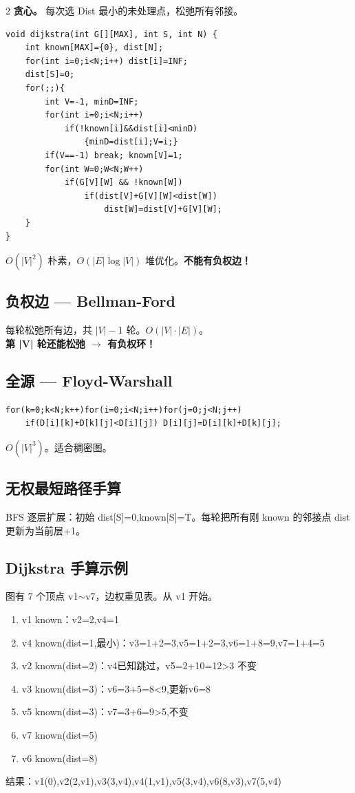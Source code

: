 \documentclass[10pt,a4paper]{article}
\begin{document}
\begin{multicols}{2}
\textbf{贪心。} 每次选 Dist 最小的未处理点，松弛所有邻接。

\begin{lstlisting}
void dijkstra(int G[][MAX], int S, int N) {
    int known[MAX]={0}, dist[N];
    for(int i=0;i<N;i++) dist[i]=INF;
    dist[S]=0;
    for(;;){
        int V=-1, minD=INF;
        for(int i=0;i<N;i++)
            if(!known[i]&&dist[i]<minD)
                {minD=dist[i];V=i;}
        if(V==-1) break; known[V]=1;
        for(int W=0;W<N;W++)
            if(G[V][W] && !known[W])
                if(dist[V]+G[V][W]<dist[W])
                    dist[W]=dist[V]+G[V][W];
    }
}
\end{lstlisting}

$O(|V|^2)$ 朴素，$O(|E|\log|V|)$ 堆优化。\textbf{不能有负权边！}

\columnbreak

\subsection*{负权边 — Bellman-Ford}

每轮松弛所有边，共 $|V|-1$ 轮。$O(|V|\cdot|E|)$。\\
\textbf{第 |V| 轮还能松弛 $\to$ 有负权环！}

\subsection*{全源 — Floyd-Warshall}

\begin{lstlisting}
for(k=0;k<N;k++)for(i=0;i<N;i++)for(j=0;j<N;j++)
    if(D[i][k]+D[k][j]<D[i][j]) D[i][j]=D[i][k]+D[k][j];
\end{lstlisting}
$O(|V|^3)$。适合稠密图。

\subsection*{无权最短路径手算}

BFS 逐层扩展：初始 dist[S]=0,known[S]=T。每轮把所有刚 known 的邻接点 dist 更新为当前层+1。

\subsection*{Dijkstra 手算示例}

图有 7 个顶点 v1$\sim$v7，边权重见表。从 v1 开始。
\begin{enumerate}
\item v1 known：v2=2,v4=1
\item v4 known(dist=1,最小)：v3=1+2=3,v5=1+2=3,v6=1+8=9,v7=1+4=5
\item v2 known(dist=2)：v4已知跳过，v5=2+10=12>3 不变
\item v3 known(dist=3)：v6=3+5=8<9,更新v6=8
\item v5 known(dist=3)：v7=3+6=9>5,不变
\item v7 known(dist=5)
\item v6 known(dist=8)
\end{enumerate}
结果：v1(0),v2(2,v1),v3(3,v4),v4(1,v1),v5(3,v4),v6(8,v3),v7(5,v4)


\end{multicols}
\end{document}
